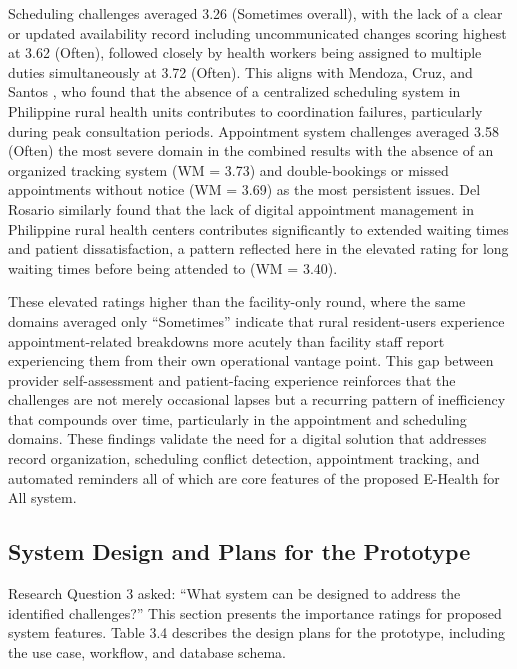 \documentclass{research}
\begin{document}
\begin{table}[H]
\vspace{4pt}
\caption{Challenges in Current Healthcare Practices}
\end{table}

Scheduling challenges averaged 3.26 (Sometimes overall), with the lack of a clear or updated availability record including uncommunicated changes scoring highest at 3.62 (Often), followed closely by health workers being assigned to multiple duties simultaneously at 3.72 (Often). This aligns with Mendoza, Cruz, and Santos \cite{ref28}, who found that the absence of a centralized scheduling system in Philippine rural health units contributes to coordination failures, particularly during peak consultation periods. Appointment system challenges averaged 3.58 (Often) the most severe domain in the combined results with the absence of an organized tracking system (WM = 3.73) and double-bookings or missed appointments without notice (WM = 3.69) as the most persistent issues. Del Rosario \cite{ref50} similarly found that the lack of digital appointment management in Philippine rural health centers contributes significantly to extended waiting times and patient dissatisfaction, a pattern reflected here in the elevated rating for long waiting times before being attended to (WM = 3.40).

These elevated ratings higher than the facility-only round, where the same domains averaged only ``Sometimes'' indicate that rural resident-users experience appointment-related breakdowns more acutely than facility staff report experiencing them from their own operational vantage point. This gap between provider self-assessment and patient-facing experience reinforces that the challenges are not merely occasional lapses but a recurring pattern of inefficiency that compounds over time, particularly in the appointment and scheduling domains. These findings validate the need for a digital solution that addresses record organization, scheduling conflict detection, appointment tracking, and automated reminders all of which are core features of the proposed E-Health for All system.

\subsection{System Design and Plans for the Prototype}

\indent Research Question 3 asked: “What system can be designed to address the identified challenges?” This section presents the importance ratings for proposed system features. Table 3.4 describes the design plans for the prototype, including the use case, workflow, and database schema. 
\end{document}

